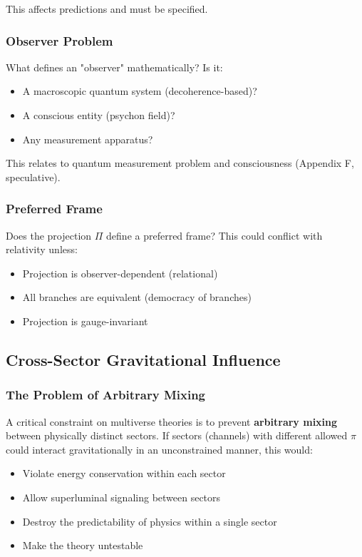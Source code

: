 This affects predictions and must be specified.

\subsubsection{Observer Problem}

What defines an "observer" mathematically? Is it:
\begin{itemize}
\item A macroscopic quantum system (decoherence-based)?
\item A conscious entity (psychon field)?
\item Any measurement apparatus?
\end{itemize}

This relates to quantum measurement problem and consciousness (Appendix F, speculative).

\subsubsection{Preferred Frame}

Does the projection $\Pi$ define a preferred frame? This could conflict with relativity unless:
\begin{itemize}
\item Projection is observer-dependent (relational)
\item All branches are equivalent (democracy of branches)
\item Projection is gauge-invariant
\end{itemize}

\subsection{Cross-Sector Gravitational Influence}

\subsubsection{The Problem of Arbitrary Mixing}

A critical constraint on multiverse theories is to prevent \textbf{arbitrary mixing} between physically distinct sectors. If sectors (channels) with different allowed $\pi$ could interact gravitationally in an unconstrained manner, this would:
\begin{itemize}
\item Violate energy conservation within each sector
\item Allow superluminal signaling between sectors
\item Destroy the predictability of physics within a single sector
\item Make the theory untestable
\end{itemize}

